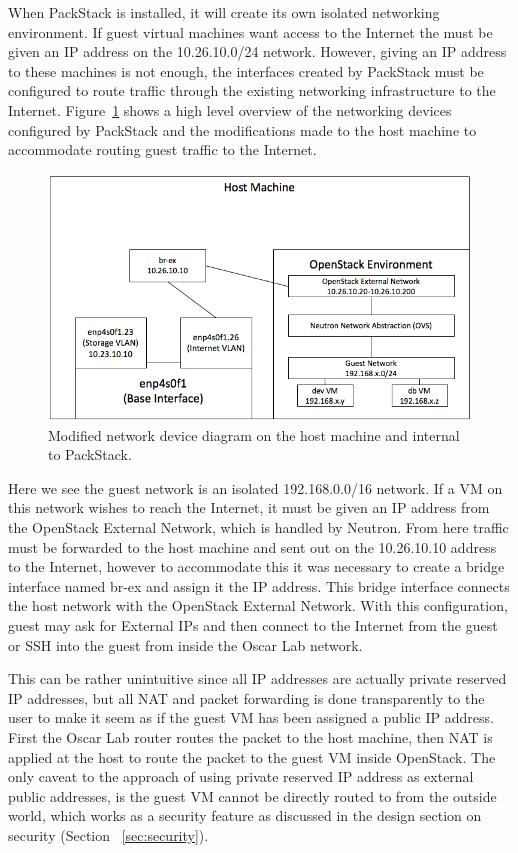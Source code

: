 When PackStack is installed, it will create its own isolated networking
environment. If guest virtual machines want access to the Internet the
must be given an IP address on the 10.26.10.0/24 network. However,
giving an IP address to these machines is not enough, the interfaces
created by PackStack must be configured to route traffic through the
existing networking infrastructure to the Internet.
Figure~\ref{fig:modified-network} shows a high level overview of the
networking devices configured by PackStack and the modifications made to
the host machine to accommodate routing guest traffic to the Internet.

\begin{figure}[H]
  \centering
  \includegraphics[scale=0.5]{img/modified-network}
  \caption{Modified network device diagram on the host machine and internal to PackStack.}
  \label{fig:modified-network}
\end{figure}

Here we see the guest network is an isolated 192.168.0.0/16 network. If
a VM on this network wishes to reach the Internet, it must be given an
IP address from the OpenStack External Network, which is handled by
Neutron. From here traffic must be forwarded to the host machine and
sent out on the 10.26.10.10 address to the Internet, however to
accommodate this it was necessary to create a bridge interface named
br-ex and assign it the IP address. This bridge interface connects the
host network with the OpenStack External Network. With this
configuration, guest may ask for External IPs and then connect to the
Internet from the guest or SSH into the guest from inside the Oscar Lab
network.

This can be rather unintuitive since all IP addresses are actually private
reserved IP addresses, but all NAT and packet forwarding is done
transparently to the user to make it seem as if the guest VM has been
assigned a public IP address. First the Oscar Lab router routes the packet
to the host machine, then NAT is applied at the host to route the packet to
the guest VM inside OpenStack. The only caveat to the approach of using
private reserved IP address as external public addresses, is the guest VM
cannot be directly routed to from the outside world, which works as a
security feature as discussed in the design section on security (Section
~\ref{sec:security}).

